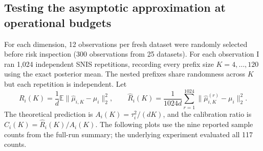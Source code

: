 \documentclass[11pt,letterpaper]{article}
\newcommand{\E}{\mathbb E}
\newcommand{\norm}[1]{\lVert #1\rVert_2}
\begin{document}
\subsection{Testing the asymptotic approximation at operational budgets}
For each dimension, 12 observations per fresh dataset were randomly selected before risk inspection (300 observations from 25 datasets). For each observation I ran 1,024 independent SNIS repetitions, recording every prefix size $K=4,\ldots,120$ using the exact posterior mean. The nested prefixes share randomness across $K$ but each repetition is independent. Let
\begin{equation}
 R_i(K)=\frac1d\E\norm{\widehat\mu_{i,K}-\mu_i}^{2},\qquad
 \widehat R_i(K)=\frac{1}{1024d}\sum_{r=1}^{1024}\norm{\widehat\mu^{(r)}_{i,K}-\mu_i}^{2}.
\end{equation}
The theoretical prediction is $A_i(K)=\tau_i^2/(dK)$, and the calibration ratio is $C_i(K)=\widehat R_i(K)/A_i(K)$. The following plots use the nine reported sample counts from the full-run summary; the underlying experiment evaluated all 117 counts.
\end{document}
